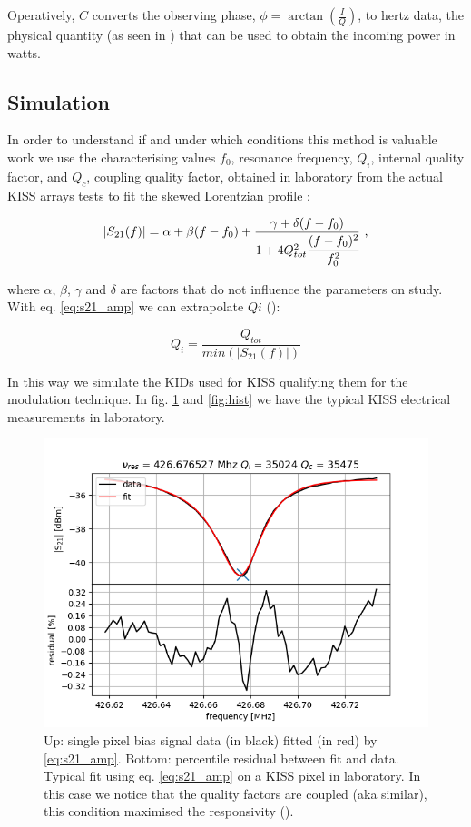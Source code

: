 \noindent Operatively, $C$ converts the observing phase, $\phi=\arctan\left( \frac{I}{Q} \right)$, to hertz data, the physical quantity (as seen in \cite{Swenson}) that can be used to obtain the incoming power in watts.


\subsection{Simulation}

In order to understand if and under which conditions this method is valuable work we use the characterising values $f_0$, resonance frequency, $Q_i$, internal quality factor, and $Q_c$, coupling quality factor, obtained in laboratory from the actual KISS arrays tests to fit the skewed Lorentzian profile \cite{Gao}:

\begin{equation}
	\left|S_{21}(f)\right|= \alpha+\beta(f-f_0)+\frac{\gamma+\delta(f-f_0)}{1+4Q_{tot}^2\cfrac{(f-f_0)^2}{f_0^2}} \text{ ,}
	\label{eq:s21_amp}
\end{equation}

\noindent where $\alpha$, $\beta$, $\gamma$ and $\delta$ are factors that do not influence the parameters on study. With eq. \ref{eq:s21_amp} we can extrapolate $Qi$ (\cite{Gao}):

\begin{equation}
Q_i =\frac{Q_{tot}}{min(\left|S_{21}(f)\right|)}
\end{equation}

\noindent In this way we simulate the KIDs used for KISS qualifying them for the modulation technique. In fig. \ref{fig:fit_amp} and \ref{fig:hist} we have the typical KISS electrical measurements in laboratory.

\begin{figure}[htf]
	\centering
	\includegraphics[width=.5\textwidth]{3.acqui/resonance_fit.png}
	\caption{Up: single pixel bias signal data (in black) fitted (in red) by \ref{eq:s21_amp}. Bottom: percentile residual between fit and data.  Typical fit using eq. \ref{eq:s21_amp} on a KISS pixel in laboratory. In this case we notice that the quality factors are coupled (aka similar), this condition maximised the responsivity (\cite{Gao}).}
	\label{fig:fit_amp}
\end{figure}

